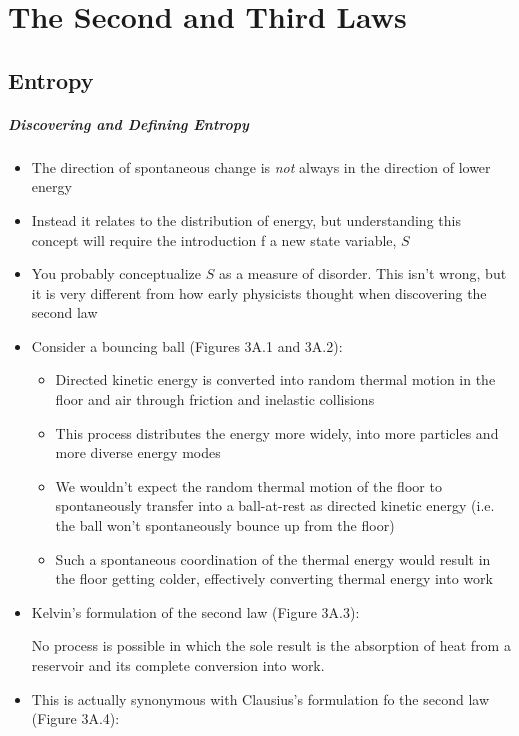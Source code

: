 \documentclass[12pt, openany, letterpaper]{memoir}
\begin{document}
\chapter{The Second and Third Laws}
\section{Entropy}
\paragraph{Discovering and Defining Entropy}
\begin{itemize}
	\item The direction of spontaneous change is \emph{not} always in the direction of lower energy
	\item Instead it relates to the distribution of energy, but understanding this concept will require the introduction f a new state variable, $S$
	\item You probably conceptualize $S$ as a measure of disorder. This isn't wrong, but it is very different from how early physicists thought when discovering the second law
	\item Consider a bouncing ball (Figures 3A.1 and 3A.2):
	      \begin{itemize}
		      \item Directed kinetic energy is converted into random thermal motion in the floor and air through friction and inelastic collisions
		      \item This process distributes the energy more widely, into more particles and more diverse energy modes
		      \item We wouldn't expect the random thermal motion of the floor to spontaneously transfer into a ball-at-rest as directed kinetic energy (i.e. the ball won't spontaneously bounce up from the floor)
		      \item Such a spontaneous coordination of the thermal energy would result in the floor getting colder, effectively converting thermal energy into work
	      \end{itemize}
	\item Kelvin's formulation of the second law (Figure 3A.3):

	      No process is possible in which the sole result is the absorption of heat from a reservoir and its complete conversion into work.

	\item This is actually synonymous with Clausius's formulation fo the second law (Figure 3A.4):


\end{itemize}
\end{document}
